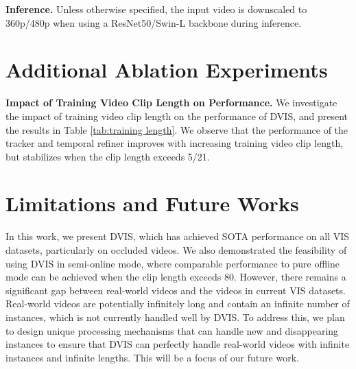 \documentclass[10pt,twocolumn,letterpaper]{article}
\begin{document}
\textbf{Inference.} Unless otherwise specified, the input video is downscaled to 360p/480p when using a ResNet50/Swin-L backbone during inference.

\section{Additional Ablation Experiments}
\textbf{Impact of Training Video Clip Length on Performance.} We investigate the impact of training video clip length on the performance of DVIS, and present the results in Table \ref{tab:training length}. We observe that the performance of the tracker and temporal refiner improves with increasing training video clip length, but stabilizes when the clip length exceeds 5/21.

\section{Limitations and Future Works}
In this work, we present DVIS, which has achieved SOTA performance on all VIS datasets, particularly on occluded videos. We also demonstrated the feasibility of using DVIS in semi-online mode, where comparable performance to pure offline mode can be achieved when the clip length exceeds 80. However, there remains a significant gap between real-world videos and the videos in current VIS datasets. Real-world videos are potentially infinitely long and contain an infinite number of instances, which is not currently handled well by DVIS. To address this, we plan to design unique processing mechanisms that can handle new and disappearing instances to ensure that DVIS can perfectly handle real-world videos with infinite instances and infinite lengths. This will be a focus of our future work.
\end{document}
